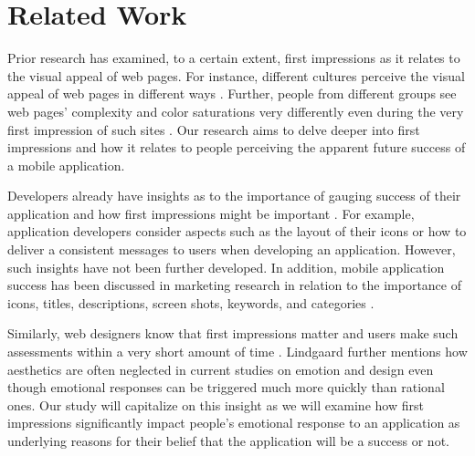 \section{Related Work}


Prior research has examined, to a certain extent, first impressions as it relates to the visual appeal of web pages. For instance, different cultures perceive the visual appeal of web pages in different ways \cite{Reinecke:2013:PUF:2470654.2481281}. Further, people from different groups see web pages' complexity and color saturations very differently even during the very first impression of such sites \cite{Reinecke:2013:PUF:2470654.2481281}. Our research aims to delve deeper into first impressions and how it relates to people perceiving the apparent future success of a mobile application.

Developers already have insights as to the importance of gauging success of their application and how first impressions might be important \cite{wooldridge2010the}. For example, application developers consider aspects such as the layout of their icons or how to deliver a consistent messages to users when developing an application. However, such insights have not been further developed. In addition, mobile application success has been discussed in marketing research in relation to the importance of icons, titles, descriptions, screen shots, keywords, and categories \cite{mureta12:app}.

Similarly, web designers know that first impressions matter and users make such assessments within a very short amount of time \cite{needsource-attentionwebdesigners}. Lindgaard \cite{needsource-attentionwebdesigners} further mentions how aesthetics are often neglected in current studies on emotion and design even though emotional responses can be triggered much more quickly than rational ones. Our study will capitalize on this insight as we will examine how first impressions  significantly impact people's emotional response to an application as underlying reasons for their belief that the application will be a success or not.
